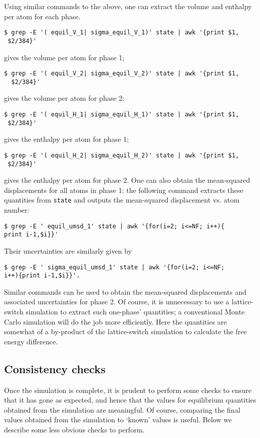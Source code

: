 \documentclass{report}
\begin{document}
Using similar commands to the above, one can extract the volume and enthalpy per atom for each phase.
\begin{verbatim}
$ grep -E '( equil_V_1| sigma_equil_V_1)' state | awk '{print $1,
 $2/384}'
\end{verbatim}
gives the volume per atom for phase 1;
\begin{verbatim}
$ grep -E '( equil_V_2| sigma_equil_V_2)' state | awk '{print $1,
  $2/384}'
\end{verbatim}
gives the volume per atom for phase 2;
\begin{verbatim}
$ grep -E '( equil_H_1| sigma_equil_H_1)' state | awk '{print $1,
 $2/384}'
\end{verbatim}
gives the enthalpy per atom for phase 1;
\begin{verbatim}
$ grep -E '( equil_H_2| sigma_equil_H_2)' state | awk '{print $1,
 $2/384}'
\end{verbatim}
gives the enthalpy per atom for phase 2. One can also obtain the mean-squared displacements for all atoms in phase 1: the following command extracts
these quantities from \texttt{state} and outputs the mean-squared displacement vs. atom number:
\begin{verbatim}
$ grep -E ' equil_umsd_1' state | awk '{for(i=2; i<=NF; i++){
print i-1,$i}}'
\end{verbatim}
Their uncertainties are similarly given by 
\begin{verbatim}
$ grep -E ' sigma_equil_umsd_1' state | awk '{for(i=2; i<=NF; 
i++){print i-1,$i}}'.
\end{verbatim}
Similar commands can be used to obtain the mean-squared displacements and associated uncertainties for phase 2. Of course, it is unnecessary to use
a lattice-switch simulation to extract such one-phase' quantities; a conventional Monte Carlo simulation will do the job more efficiently.
Here the quantities are somewhat of a by-product of the lattice-switch simulation to calculate the free energy difference.

\subsection{Consistency checks}
Once the simulation is complete, it is prudent to perform some checks to ensure that it has gone as expected, and hence that the values for equilibrium
quantities obtained from the simulation are meaningful. Of course, comparing the final values obtained from the simulation to `known' values is useful.
Below we describe some less obvious checks to perform.
\end{document}
